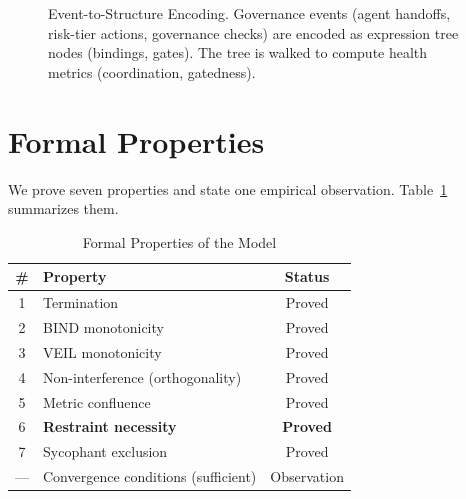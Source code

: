 \documentclass[sigconf,nonacm]{acmart}
\begin{document}
\begin{figure}[t]
  \caption{Event-to-Structure Encoding. Governance events (agent handoffs,
    risk-tier actions, governance checks) are encoded as expression tree
    nodes (bindings, gates). The tree is walked to compute
    health metrics (coordination, gatedness).}
  \label{fig:encoding}
\end{figure}


\section{Formal Properties}\label{sec:formal}

We prove seven properties and state one empirical observation.
Table~\ref{tab:properties} summarizes them.

\begin{table}[t]
  \caption{Formal Properties of the Model}\label{tab:properties}
  \small
  \begin{tabular}{@{}clc@{}}
    \toprule
    \textbf{\#} & \textbf{Property} & \textbf{Status} \\
    \midrule
    1 & Termination & Proved \\
    2 & BIND monotonicity & Proved \\
    3 & VEIL monotonicity & Proved \\
    4 & Non-interference (orthogonality) & Proved \\
    5 & Metric confluence & Proved \\
    6 & \textbf{Restraint necessity} & \textbf{Proved} \\
    7 & Sycophant exclusion & Proved \\
    \midrule
    --- & Convergence conditions (sufficient) & Observation \\
    \bottomrule
  \end{tabular}
\end{table}
\end{document}
